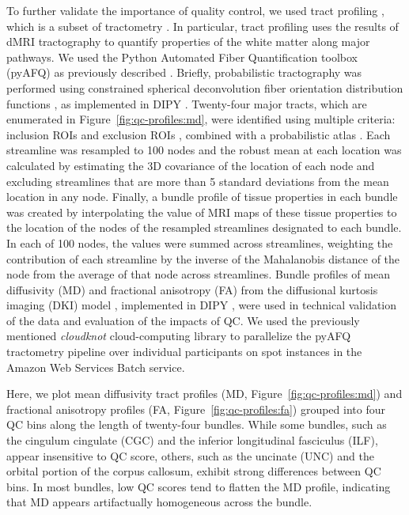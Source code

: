 \documentclass[fleqn,10pt,inline]{wlscirep}
\begin{document}
To further validate the importance of quality control, we used tract profiling \cite{yeatman2012-rc,jones2005pasta,colby2012along,odonnell2009tract, kruper2021evaluating}, which is a subset of tractometry \cite{jones2005pasta,bells2011tractometry}. In particular, tract profiling uses the results of dMRI tractography to quantify properties of the white matter along major pathways. We used the Python Automated Fiber Quantification toolbox (pyAFQ) as previously described \cite{kruper2021evaluating}. Briefly, probabilistic tractography was performed using constrained spherical deconvolution fiber orientation distribution functions \cite{tournier2008csd}, as implemented in DIPY \cite{dipy}. Twenty-four major tracts, which are enumerated in Figure~\ref{fig:qc-profiles:md}, were identified using multiple criteria: inclusion ROIs and exclusion ROIs \cite{Wakana2007-nw}, combined with a probabilistic atlas \cite{Hua2008-di}. Each streamline was resampled to 100 nodes and the robust mean at each location was calculated by estimating the 3D covariance of the location of each node and excluding streamlines that are more than 5 standard deviations from the mean location in any node. Finally, a bundle profile of tissue properties in each bundle was created by interpolating the value of MRI maps of these tissue properties to the location of the nodes of the resampled streamlines designated to each bundle. In each of 100 nodes, the values were summed across streamlines, weighting the contribution of each streamline by the inverse of the Mahalanobis distance of the node from the average of that node across streamlines. Bundle profiles of mean diffusivity (MD) and fractional anisotropy (FA) from the diffusional kurtosis imaging (DKI) model \cite{jensen2005-ta}, implemented in DIPY \cite{Henriques2021-lk}, were used in technical validation of the data and evaluation of the impacts of QC.
We used the previously mentioned \emph{cloudknot} cloud-computing library \cite{cloudknot} to parallelize the pyAFQ tractometry pipeline over individual participants on spot instances in the
Amazon Web Services Batch service.

Here, we plot mean diffusivity tract profiles (MD, Figure~\ref{fig:qc-profiles:md}) and fractional anisotropy profiles (FA, Figure~\ref{fig:qc-profiles:fa}) grouped
into four QC bins along the length of twenty-four bundles. While some bundles,
such as the cingulum cingulate (CGC) and the inferior longitudinal fasciculus
(ILF), appear insensitive to QC score, others, such as the uncinate (UNC) and
the orbital portion of the corpus callosum, exhibit strong differences between
QC bins. In most bundles, low QC scores tend to flatten the MD profile, indicating that MD appears artifactually homogeneous across the bundle.
\end{document}
